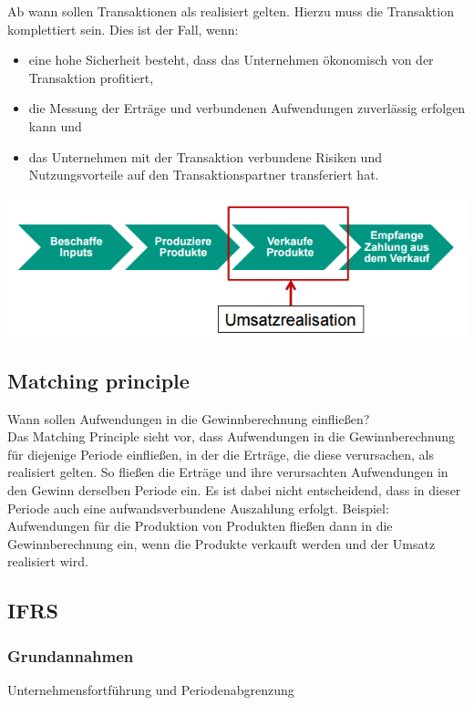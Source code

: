 \documentclass{article}
\begin{document}
Ab wann sollen Transaktionen als realisiert gelten. Hierzu muss die Transaktion komplettiert sein. Dies ist der Fall, wenn:
\begin{itemize}
\item eine hohe Sicherheit besteht, dass das Unternehmen ökonomisch
von der Transaktion profitiert,\\
\item die Messung der Erträge und verbundenen Aufwendungen zuverlässig
erfolgen kann und\\
\item das Unternehmen mit der Transaktion verbundene Risiken und
Nutzungsvorteile auf den Transaktionspartner transferiert hat.
\end{itemize}
\begin{center}
\includegraphics[scale=.5]{umsatzrealisation.png}
\end{center}

\subsection{Matching principle}

Wann sollen Aufwendungen in die Gewinnberechnung einfließen? \\
Das Matching Principle sieht vor, dass Aufwendungen in die
Gewinnberechnung für diejenige Periode einfließen, in der die Erträge, die
diese verursachen, als realisiert gelten.
So fließen die Erträge und ihre verursachten Aufwendungen in den Gewinn
derselben Periode ein.
Es ist dabei nicht entscheidend, dass in dieser Periode auch eine
aufwandsverbundene Auszahlung erfolgt.
Beispiel: Aufwendungen für die Produktion von Produkten fließen dann in die
Gewinnberechnung ein, wenn die Produkte verkauft werden und der Umsatz
realisiert wird.

\subsection{IFRS }
\subsubsection{Grundannahmen}
Unternehmensfortführung und Periodenabgrenzung
\end{document}
